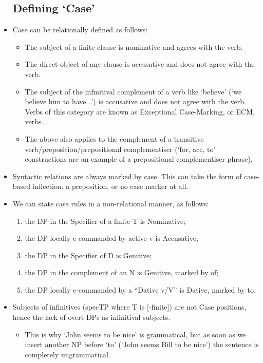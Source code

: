 \documentclass{article}
\begin{document}
\begin{itemize}
    \subsection{Defining `Case'}
    \item Case can be relationally defined as follows:
    \begin{itemize}
        \item The subject of a finite clause is nominative and agrees with the verb.
        \item The direct object of any clause is accusative and does not agree with the verb.
        \item The subject of the infinitival complement of a verb like `believe' (`we believe him to have...') is accusative and does not agree with the verb. Verbs of this category are known as Exceptional Case-Marking, or ECM, verbs.
        \item The above also applies to the complement of a transitive verb/preposition/prepositional complementiser (`for, acc, to' constructions are an example of a prepositional complementiser phrase).
    \end{itemize}
    \item Syntactic relations are always marked by case. This can take the form of case-based inflection, a preposition, or no case marker at all.
    \item We can state case rules in a non-relational manner, as follows:
    \begin{enumerate}
        \item the DP in the Specifier of a finite T is Nominative;
        \item the DP locally c-commanded by active v is Accusative;
        \item the DP in the Specifier of D is Genitive;
        \item the DP in the complement of an N is Genitive, marked by of;
        \item the DP locally c-commanded by a “Dative v/V” is Dative, marked by to.
    \end{enumerate}
    \item Subjects of infinitives (specTP where T is [-finite]) are not Case positions, hence the lack of overt DPs as infinitival subjects.
    \begin{itemize}
        \item This is why `John seems to be nice' is grammatical, but as soon as we insert another NP before `to' (`John seems Bill to be nice') the sentence is completely ungrammatical.
    \end{itemize}

\end{itemize}
\end{document}
